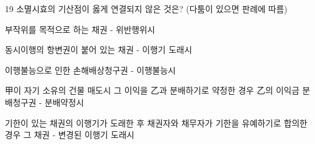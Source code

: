 \begin{question}{19}
소멸시효의 기산점이 옳게 연결되지 않은 것은? (다툼이 있으면 판례에 따름)
\begin{choices}
  \item 부작위를 목적으로 하는 채권 - 위반행위시
  \item 동시이행의 항변권이 붙어 있는 채권 - 이행기 도래시
  \item 이행불능으로 인한 손해배상청구권 - 이행불능시
  \item 甲이 자기 소유의 건물 매도시 그 이익을 乙과 분배하기로 약정한 경우 乙의 이익금 분배청구권 - 분배약정시
  \item 기한이 있는 채권의 이행기가 도래한 후 채권자와 채무자가 기한을 유예하기로 합의한 경우 그 채권 - 변경된 이행기 도래시
\end{choices}
\end{question}
